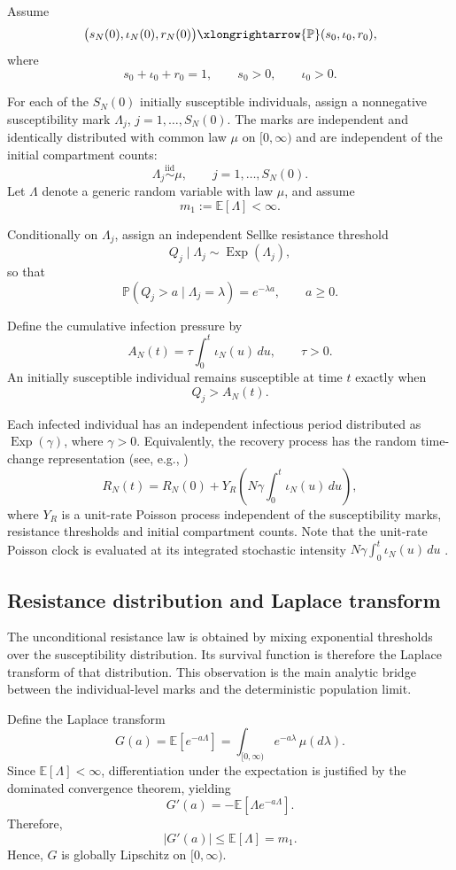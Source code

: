 \documentclass[pdflatex,sn-mathphys-ay]{sn-jnl}
\theoremstyle{thmstyleone}
\theoremstyle{thmstyletwo}
\theoremstyle{thmstylethree}
\newcommand{\E}{\mathbb{E}}
\newcommand{\Pp}{\mathbb{P}}
\begin{document}
Assume
\[
\bigl(s_N(0),\iota_N(0),r_N(0)\bigr)
\xlongrightarrow{\Pp}
(s_0,\iota_0,r_0),
\]
where
\[
s_0+\iota_0+r_0=1,\qquad s_0>0,\qquad \iota_0>0.
\]

For each of the $S_N(0)$ initially susceptible individuals, assign a nonnegative
susceptibility mark $\Lambda_j$, $j=1,\ldots,S_N(0)$. The marks are independent
and identically distributed with common law $\mu$ on $[0,\infty)$ and are
independent of the initial compartment counts:
\[
\Lambda_j \stackrel{\mathrm{iid}}{\sim} \mu,
\qquad j=1,\ldots,S_N(0).
\]
Let $\Lambda$ denote a generic random variable with law $\mu$, and assume
\[
m_1:=\E[\Lambda]<\infty.
\]

Conditionally on \(\Lambda_j\), assign an independent Sellke resistance
threshold
\[
Q_j\mid \Lambda_j\sim \operatorname{Exp}(\Lambda_j),
\]
so that
\[
\Pp(Q_j>a\mid \Lambda_j=\lambda)=e^{-\lambda a},
\qquad a\geq 0.
\]

Define the cumulative infection pressure by
\[
A_N(t)=\tau\int_0^t\iota_N(u)\,du,
\qquad \tau>0.
\]
An initially susceptible individual remains susceptible at time \(t\) exactly
when
\[
Q_j>A_N(t).
\]

Each infected individual has an independent infectious period distributed as
\(\operatorname{Exp}(\gamma)\), where \(\gamma>0\). Equivalently, the recovery
process has the random time-change representation (see, e.g., \cite{AndersonKurtz2015})
\[
R_N(t)
=
R_N(0)+
Y_R\left(
N\gamma\int_0^t\iota_N(u)\,du
\right),
\]
where \(Y_R\) is a unit-rate Poisson process independent of the susceptibility
marks, resistance thresholds  and  initial compartment counts. Note that the unit-rate Poisson clock
is evaluated at its integrated stochastic intensity
\(N\gamma\int_0^t\iota_N(u)\,du\)
\citep{Kurtz1980,AndersonKurtz2015}.

\subsection{Resistance distribution and Laplace transform}

The unconditional resistance law is obtained by mixing exponential
thresholds over the susceptibility distribution. Its survival function is
therefore the Laplace transform of that distribution. This observation is the
main analytic bridge between the individual-level marks and the deterministic
population limit.

Define the Laplace transform
\begin{equation}\label{eq:Ga}
G(a)
=
\E[e^{-a\Lambda}]
=
\int_{[0,\infty)} e^{-a\lambda}\,\mu(d\lambda).
\end{equation}
Since \(\E[\Lambda]<\infty\), differentiation under the expectation is justified
by the dominated convergence theorem, yielding
\[
G'(a)
=
-\E[\Lambda e^{-a\Lambda}].
\]
Therefore,
\[
|G'(a)|
\leq
\E[\Lambda]
=
m_1.
\]
Hence, \(G\) is globally Lipschitz on \([0,\infty)\).
\end{document}
